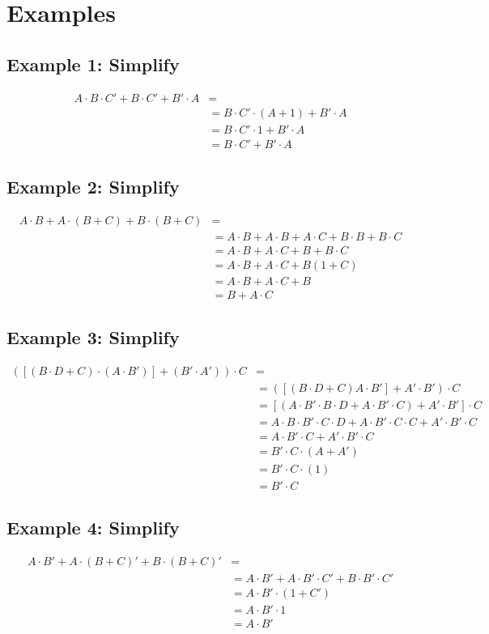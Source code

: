 \section*{Examples}
\subsection*{Example 1: Simplify}
\begin{align*}
A \cdot B \cdot C' + B \cdot C' + B' \cdot A &=\\ 
&= B \cdot C' \cdot (A + 1) + B' \cdot A\\
&= B \cdot C' \cdot 1 + B' \cdot A\\
&= B \cdot C' + B' \cdot A
\end{align*}
\subsection*{Example 2: Simplify}
\begin{align*}
A \cdot B + A \cdot (B+C) + B \cdot (B + C) &= \\
&= A\cdot B + A\cdot B + A\cdot C + B \cdot B + B \cdot C\\
&= A \cdot B + A \cdot C + B + B \cdot C \\
&= A \cdot B + A \cdot C + B (1 + C)\\
&= A \cdot B + A \cdot C + B\\
&= B + A\cdot C
\end{align*}
\subsection*{Example 3: Simplify}
\begin{align*}
\left([(B \cdot D + C)\cdot (A \cdot B')] + (B' \cdot A')\right) \cdot C &= \\
&= ([(B \cdot D + C)A\cdot B']+ A' \cdot B')\cdot C\\
&= [(A\cdot B' \cdot B \cdot D + A \cdot B' \cdot C) + A' \cdot B']\cdot C\\
&= A \cdot B \cdot B' \cdot C \cdot D + A \cdot B' \cdot C \cdot C + A' \cdot B' \cdot C\\
&= A \cdot B' \cdot C + A' \cdot B' \cdot C\\
&= B' \cdot C\cdot (A+A')\\
&= B' \cdot C \cdot (1)\\
&= B' \cdot C
\end{align*}
\subsection*{Example 4: Simplify}
\begin{align*}
A \cdot B' + A \cdot (B+C)' +B\cdot (B+C)' &= \\
&= A\cdot B' + A\cdot B' \cdot C' + B \cdot B' \cdot C'\\
&= A \cdot B' \cdot (1 + C')\\
&= A \cdot B' \cdot 1\\
&= A \cdot B'
\end{align*}